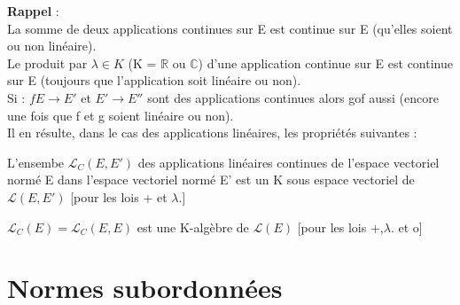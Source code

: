 \textbf{Rappel} : \\
La somme de deux applications continues sur E est continue sur E (qu'elles soient ou non linéaire).\\
Le produit par $\lambda \in K$ (K = $\mathbb{R}$ ou $\mathbb{C}$) d'une application continue sur E est continue sur E (toujours que l'application soit linéaire ou non).\\
Si : $f E \rightarrow E'$ et $E' \rightarrow E''$ sont des applications continues alors gof aussi (encore une fois que f et g soient linéaire ou non).\\
Il en résulte, dans le cas des applications linéaires, les propriétés suivantes : 
\begin{prop}
L'ensembe $\mathcal{L}_C(E,E')$ des applications linéaires continues de l'espace vectoriel normé E dans l'espace vectoriel normé E' est un K sous espace vectoriel de $\mathcal{L}(E,E')$ [pour les lois + et $\lambda.$]
\end{prop}
\begin{prop}
$\mathcal{L}_C(E) = \mathcal{L}_C(E,E)$ est une K-algèbre de $\mathcal{L}(E)$ [pour les lois +,$\lambda.$ et o]
\end{prop}
\section{Normes subordonnées}
